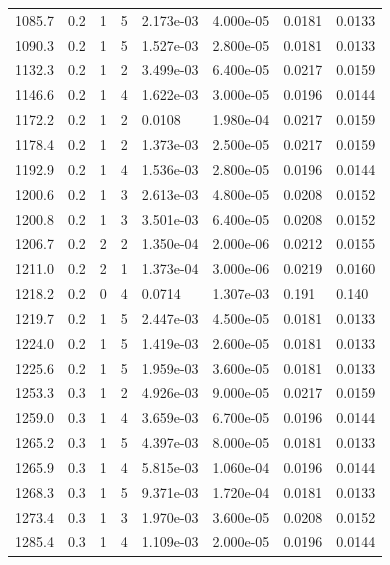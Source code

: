 \documentclass[preview]{standalone}
\begin{document}
{{{\begin{tabular}{L{1.2cm}C{1.2cm} C{0.3cm}C{0.5cm} C{1.4cm}C{1.4cm} C{1.4cm}C{1.4cm}}
  1085.7  &   0.2  & 1     &  5 &  2.173e-03  & 4.000e-05  & 0.0181 &  0.0133   \\ 
  1090.3  &   0.2  & 1     &  5 &  1.527e-03  & 2.800e-05  & 0.0181 &  0.0133   \\ 
  1132.3  &   0.2  & 1     &  2 &  3.499e-03  & 6.400e-05  & 0.0217 &  0.0159   \\ 
  1146.6  &   0.2  & 1     &  4 &  1.622e-03  & 3.000e-05  & 0.0196 &  0.0144   \\ 
  1172.2  &   0.2  & 1     &  2 &  0.0108  & 1.980e-04  & 0.0217 &  0.0159   \\ 
  1178.4  &   0.2  & 1     &  2 &  1.373e-03  & 2.500e-05  & 0.0217 &  0.0159   \\ 
  1192.9  &   0.2  & 1     &  4 &  1.536e-03  & 2.800e-05  & 0.0196 &  0.0144   \\ 
  1200.6  &   0.2  & 1     &  3 &  2.613e-03  & 4.800e-05  & 0.0208 &  0.0152   \\ 
  1200.8  &   0.2  & 1     &  3 &  3.501e-03  & 6.400e-05  & 0.0208 &  0.0152   \\ 
  1206.7  &   0.2  & 2     &  2 &  1.350e-04  & 2.000e-06  & 0.0212 &  0.0155   \\ 
  1211.0  &   0.2  & 2     &  1 &  1.373e-04  & 3.000e-06  & 0.0219 &  0.0160   \\ 
  1218.2  &   0.2  & 0     &  4 &  0.0714  & 1.307e-03  & 0.191 &  0.140   \\ 
  1219.7  &   0.2  & 1     &  5 &  2.447e-03  & 4.500e-05  & 0.0181 &  0.0133   \\ 
  1224.0  &   0.2  & 1     &  5 &  1.419e-03  & 2.600e-05  & 0.0181 &  0.0133   \\ 
  1225.6  &   0.2  & 1     &  5 &  1.959e-03  & 3.600e-05  & 0.0181 &  0.0133   \\ 
  1253.3  &   0.3  & 1     &  2 &  4.926e-03  & 9.000e-05  & 0.0217 &  0.0159   \\ 
  1259.0  &   0.3  & 1     &  4 &  3.659e-03  & 6.700e-05  & 0.0196 &  0.0144   \\ 
  1265.2  &   0.3  & 1     &  5 &  4.397e-03  & 8.000e-05  & 0.0181 &  0.0133   \\ 
  1265.9  &   0.3  & 1     &  4 &  5.815e-03  & 1.060e-04  & 0.0196 &  0.0144   \\ 
  1268.3  &   0.3  & 1     &  5 &  9.371e-03  & 1.720e-04  & 0.0181 &  0.0133   \\ 
  1273.4  &   0.3  & 1     &  3 &  1.970e-03  & 3.600e-05  & 0.0208 &  0.0152   \\ 
  1285.4  &   0.3  & 1     &  4 &  1.109e-03  & 2.000e-05  & 0.0196 &  0.0144   \\ 

\end{tabular}}}}
\end{document}
